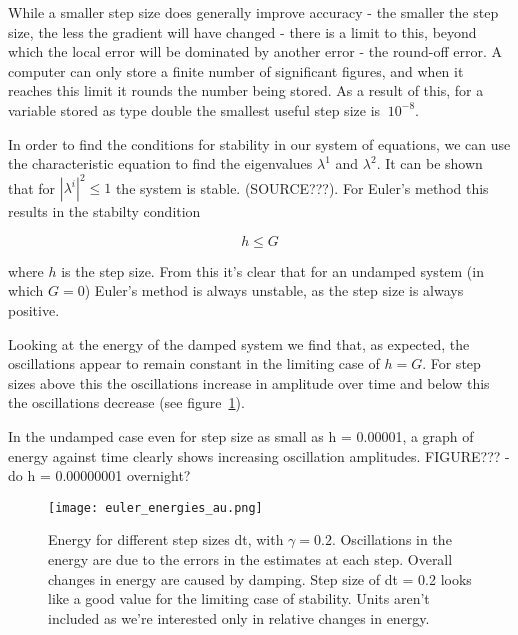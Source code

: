 \documentclass[a4paper,11pt,twoside]{article}
\begin{document}

While a smaller step size does generally improve accuracy - the smaller 
the step size, the less the gradient will have changed - there is 
a limit to this, beyond which the local error will be dominated by 
another error - the round-off error. A computer can only store a 
finite number of significant figures, and when it reaches this limit 
it rounds the number being stored. As a result of this, for a variable 
stored as type double the smallest useful step size is \(~10^{-8}\).

In order to find the conditions for stability in our system of 
equations, we can 
use the characteristic equation to find the eigenvalues 
\(\lambda^{1}\) and \(\lambda^{2}\). 
It can be shown that for \(|\lambda^{i}|^{2} \leq 1\) the system is stable.
(SOURCE???). For Euler's method this results in the stabilty condition

\begin{equation}
	\label{eq:econd}
	h \leq G
\end{equation}

where \(h\) is the step size.
From this it's clear that for an undamped system (in which \(G=0\))
Euler's method is always unstable, as the step size is always positive.

Looking at the energy of the damped system
we find that, as expected, the oscillations 
appear to remain constant in the limiting case of \(h = G\). For step 
sizes above this the oscillations increase in amplitude over time 
and below this the oscillations 
decrease (see figure~\ref{fig:econd}).

In the undamped case even for step size as small as h = 0.00001, 
a graph of energy against time clearly shows increasing oscillation 
amplitudes.
FIGURE??? - do h = 0.00000001 overnight?

\begin{figure}[htb]
	\centering
	\texttt{[image: euler\_energies\_au.png]}
	\caption{Energy for different step sizes dt, with \(\gamma = 0.2\). 
		Oscillations in the energy are due to the errors in 
		the estimates at each step. 
		Overall changes in energy are caused by damping.
		Step size of dt = 0.2 looks like a good value for 
		the limiting case of stability. Units aren't included 
		as we're interested only in relative changes in energy.}
	\label{fig:econd}
\end{figure}
\end{document}
